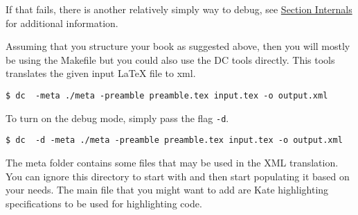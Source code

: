 \begin{note}
\begin{gram}
If that fails, there is another relatively simply way to debug, see \href{sec:dc::internals}{Section Internals} for additional information.
\end{gram}

\begin{gram}
Assuming that you structure your book as suggested above, then you will mostly be using the Makefile but you could also use the DC tools directly. 
%
This tools translates the given input LaTeX file to xml.

\begin{lstlisting}
$ dc  -meta ./meta -preamble preamble.tex input.tex -o output.xml
\end{lstlisting}

To turn on the debug mode, simply pass the flag \lstinline`-d`.
\begin{lstlisting}
$ dc  -d -meta ./meta -preamble preamble.tex input.tex -o output.xml
\end{lstlisting}

The meta folder contains some files that may be used in the XML translation.  You can ignore this directory to start with and then start populating it based on your needs.  The main file that you might want to add are Kate highlighting specifications to be used for highlighting code.
\end{gram}








\end{note}
